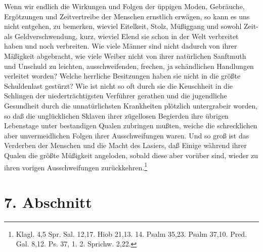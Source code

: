 Wenn wir endlich die Wirkungen und Folgen der üppigen Moden, Gebräuche, Ergötzungen und Zeitvertreibe der Menschen ernstlich erwägen, so kann es uns nicht entgehen, zu bemerken, wieviel Eitelkeit, Stolz, Müßiggang und sowohl Zeit- als Geldverschwendung, kurz, wieviel Elend sie schon in der Welt verbreitet haben und noch verbreiten. Wie viele Männer sind nicht dadurch von ihrer Mäßigkeit abgebracht, wie viele Weiber nicht von ihrer natürlichen Sanftmuth und Unschuld zu leichten, ausschweifenden, frechen, ja schändlichen Handlungen verleitet worden? Welche herrliche Besitzungen haben sie nicht in die größte Schuldenlast gestürzt? Wie ist nicht so oft durch sie die Keuschheit in die Schlingen der niederträchtigsten Verführer gerathen und die jugendliche Gesundheit durch die unnatürlichsten Krankheiten plötzlich untergrabeir worden, so daß die unglücklichen Sklaven ihrer zügellosen Begierden ihre übrigen Lebenstage unter bestandigen Qualen zubringen mußten, weiche die schrecklichen aber unvermeidlichen Folgen ihrer Ausschweifungen waren. Und so groß ist das Verderben der Menschen und die Macht des Lasiers, daß Einige während ihrer Qualen die größte Müßigkeit angeloden, sobald diese aber vorüber sind, wieder zu ihren vorigen Ausschweifungen zurückkehren.\footnote{Klagl. 4,5 Spr. Sal. 12,17. Hiob 21,13. 14. Psalm 35,23. Psalm 37,10. Pred. Gal. 8,12. Ps. 37, 1. 2. Sprichw. 2,22.}

\section{7. Abschnitt}

